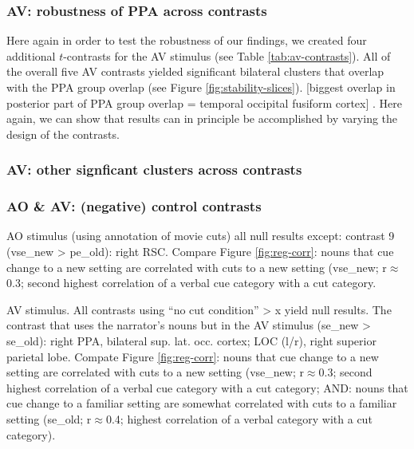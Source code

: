 \documentclass[english]{article}
\begin{document}
\subsubsection{AV: robustness of PPA across contrasts}

Here again in order to test the robustness of our findings, we created four
additional $t$-contrasts for the AV stimulus (see Table \ref{tab:av-contrasts}).
All of the overall five AV contrasts yielded significant bilateral clusters that
overlap with the PPA group overlap (see Figure \ref{fig:stability-slices}).
[biggest overlap in posterior part of PPA group overlap  = temporal occipital
fusiform cortex] .
Here again, we can show that results can in principle be accomplished by varying
the design of the contrasts.

\subsubsection{AV: other signficant clusters across contrasts}


\subsubsection{AO \& AV: (negative) control contrasts}


AO stimulus (using annotation of movie cuts) all null results except: contrast 9
(vse\_new > pe\_old): right RSC.
Compare Figure \ref{fig:reg-corr}: nouns that cue change to a new setting are
correlated  with cuts to a new setting (vse\_new; r$\approx$0.3; second highest
correlation of a verbal cue category with a cut category.

AV stimulus. All contrasts using ``no cut condition'' > x yield null results.
The contrast that uses the narrator's nouns but in the AV stimulus (se\_new >
se\_old): right PPA, bilateral sup. lat. occ. cortex; LOC (l/r), right superior
parietal lobe. Compate Figure \ref{fig:reg-corr}: nouns that cue change to a new
setting are correlated  with cuts to a new setting (vse\_new; r$\approx$0.3;
second highest correlation of a verbal cue category with a cut category; AND:
nouns that cue change to a familiar setting are somewhat correlated with cuts to
a familiar setting (se\_old; r$\approx$0.4; highest correlation of a verbal
category with a cut category).
\end{document}
